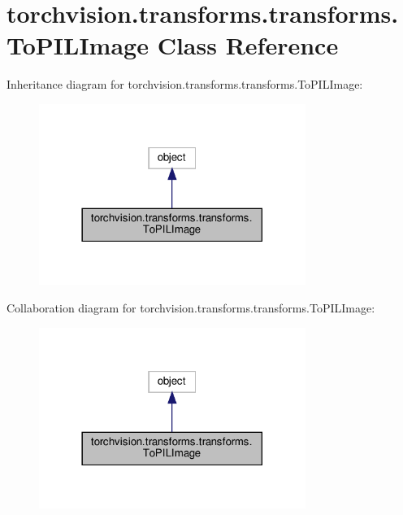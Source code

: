 \hypertarget{classtorchvision_1_1transforms_1_1transforms_1_1ToPILImage}{}\section{torchvision.\+transforms.\+transforms.\+To\+P\+I\+L\+Image Class Reference}
\label{classtorchvision_1_1transforms_1_1transforms_1_1ToPILImage}


Inheritance diagram for torchvision.\+transforms.\+transforms.\+To\+P\+I\+L\+Image\+:
\nopagebreak
\begin{figure}[H]
\begin{center}
\leavevmode
\includegraphics[width=246pt]{classtorchvision_1_1transforms_1_1transforms_1_1ToPILImage__inherit__graph}
\end{center}
\end{figure}


Collaboration diagram for torchvision.\+transforms.\+transforms.\+To\+P\+I\+L\+Image\+:
\nopagebreak
\begin{figure}[H]
\begin{center}
\leavevmode
\includegraphics[width=246pt]{classtorchvision_1_1transforms_1_1transforms_1_1ToPILImage__coll__graph}
\end{center}
\end{figure}
